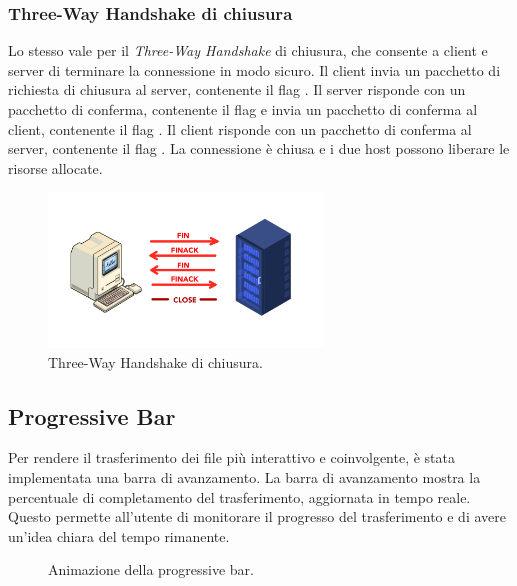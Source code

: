 \subsubsection{Three-Way Handshake di chiusura}
Lo stesso vale per il \textit{Three-Way Handshake} di chiusura, che consente a client e server di terminare la connessione in modo sicuro.
Il client invia un pacchetto di richiesta di chiusura al server, contenente il flag .
Il server risponde con un pacchetto di conferma, contenente il flag  e invia un pacchetto di conferma al client, contenente il flag .
Il client risponde con un pacchetto di conferma al server, contenente il flag .
La connessione è chiusa e i due host possono liberare le risorse allocate.

\begin{figure}[h]
    \centering
    \includegraphics[width=0.65\textwidth]{imgs/02/three-way-handshake-chiusura.jpeg}
    \caption{Three-Way Handshake di chiusura.}
\end{figure}


\subsection{Progressive Bar }
Per rendere il trasferimento dei file più interattivo e coinvolgente, è stata implementata una barra di avanzamento.
La barra di avanzamento mostra la percentuale di completamento del trasferimento, aggiornata in tempo reale.
Questo permette all'utente di monitorare il progresso del trasferimento e di avere un'idea chiara del tempo rimanente.

\begin{figure}[ht]
    \centering
    \caption{Animazione della progressive bar.}
\end{figure}

